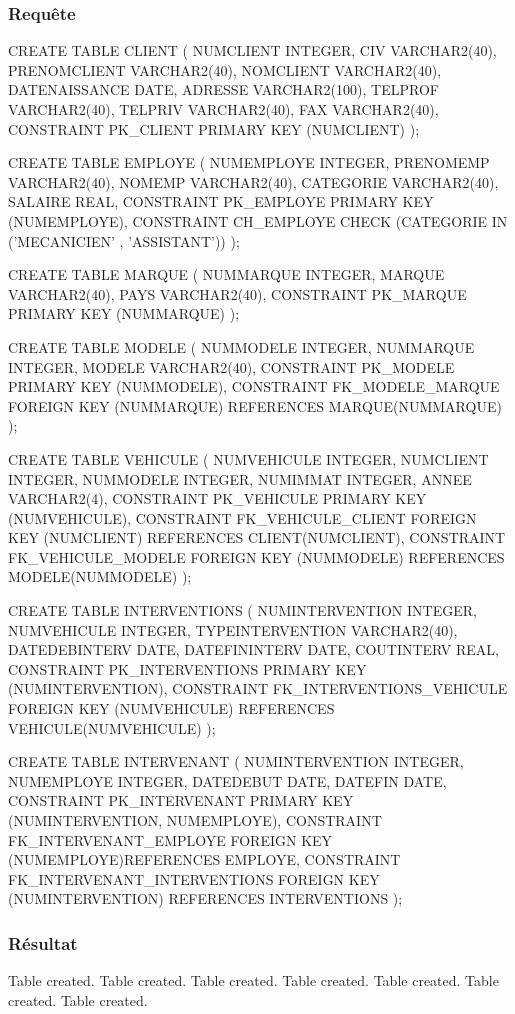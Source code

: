 \documentclass[•]{article}
\begin{document}
\subsubsection{Requête}
\begin{sql}
CREATE TABLE CLIENT
(
NUMCLIENT INTEGER,
CIV VARCHAR2(40),
PRENOMCLIENT VARCHAR2(40),
NOMCLIENT VARCHAR2(40),
DATENAISSANCE DATE,
ADRESSE VARCHAR2(100),
TELPROF VARCHAR2(40),
TELPRIV VARCHAR2(40),
FAX VARCHAR2(40),
CONSTRAINT PK_CLIENT PRIMARY KEY (NUMCLIENT)
);

CREATE TABLE EMPLOYE
(
NUMEMPLOYE INTEGER,
PRENOMEMP VARCHAR2(40),
NOMEMP VARCHAR2(40),
CATEGORIE VARCHAR2(40),
SALAIRE REAL,
CONSTRAINT PK_EMPLOYE PRIMARY KEY (NUMEMPLOYE),
CONSTRAINT CH_EMPLOYE CHECK (CATEGORIE IN ('MECANICIEN' , 'ASSISTANT'))
);

CREATE TABLE MARQUE (
NUMMARQUE INTEGER,
MARQUE VARCHAR2(40),
PAYS VARCHAR2(40),
CONSTRAINT PK_MARQUE PRIMARY KEY (NUMMARQUE)
);

CREATE TABLE MODELE (
NUMMODELE INTEGER,
NUMMARQUE INTEGER,
MODELE VARCHAR2(40),
CONSTRAINT PK_MODELE PRIMARY KEY (NUMMODELE),
CONSTRAINT FK_MODELE_MARQUE FOREIGN KEY (NUMMARQUE) REFERENCES MARQUE(NUMMARQUE)
);

CREATE TABLE VEHICULE (
NUMVEHICULE INTEGER,
NUMCLIENT INTEGER,
NUMMODELE INTEGER,
NUMIMMAT INTEGER,
ANNEE VARCHAR2(4),
CONSTRAINT PK_VEHICULE PRIMARY KEY (NUMVEHICULE),
CONSTRAINT FK_VEHICULE_CLIENT FOREIGN KEY (NUMCLIENT) REFERENCES CLIENT(NUMCLIENT),
CONSTRAINT FK_VEHICULE_MODELE FOREIGN KEY (NUMMODELE) REFERENCES MODELE(NUMMODELE)
);

CREATE TABLE INTERVENTIONS (
NUMINTERVENTION INTEGER,
NUMVEHICULE INTEGER,
TYPEINTERVENTION VARCHAR2(40),
DATEDEBINTERV DATE,
DATEFININTERV DATE,
COUTINTERV REAL,
CONSTRAINT PK_INTERVENTIONS PRIMARY KEY (NUMINTERVENTION),
CONSTRAINT FK_INTERVENTIONS_VEHICULE FOREIGN KEY (NUMVEHICULE) REFERENCES VEHICULE(NUMVEHICULE)
);

CREATE TABLE INTERVENANT
(
NUMINTERVENTION INTEGER,
NUMEMPLOYE INTEGER,
DATEDEBUT DATE,
DATEFIN DATE,
CONSTRAINT PK_INTERVENANT PRIMARY KEY (NUMINTERVENTION, NUMEMPLOYE),
CONSTRAINT FK_INTERVENANT_EMPLOYE FOREIGN KEY (NUMEMPLOYE)REFERENCES EMPLOYE,
CONSTRAINT FK_INTERVENANT_INTERVENTIONS FOREIGN KEY (NUMINTERVENTION) REFERENCES INTERVENTIONS
);
\end{sql}
\subsubsection{Résultat}
\begin{sql}
Table created.
Table created.
Table created.
Table created.
Table created.
Table created.
Table created.
\end{sql}
\end{document}
